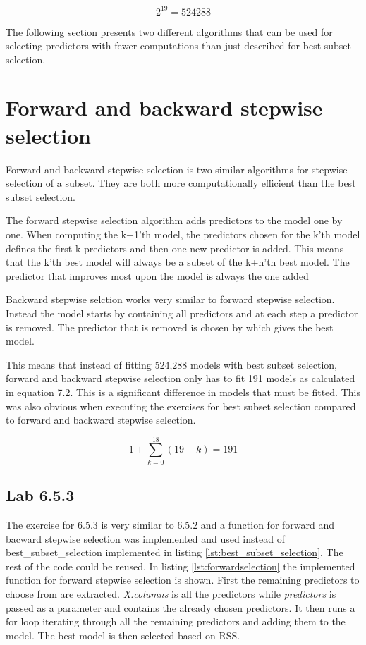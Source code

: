 \begin{equation}
2^{19} = 524288
\end{equation}

The following section presents two different algorithms that can be used for selecting predictors with fewer computations than just described for best subset selection.

\section{Forward and backward stepwise selection}
Forward and backward stepwise selection is two similar algorithms for stepwise selection of a subset. They are both more computationally efficient than the best subset selection.

The forward stepwise selection algorithm adds predictors to the model one by one. When computing the k+1'th model, the predictors chosen for the k'th model defines the first k predictors and then one new predictor is added. This means that the k'th best model will always be a subset of the k+n'th best model. The predictor that improves most upon the model is always the one added

Backward stepwise selction works very similar to forward stepwise selection. Instead the model starts by containing all predictors and at each step a predictor is removed. The predictor that is removed is chosen by which gives the best model.

This means that instead of fitting 524,288 models with best subset selection, forward and backward stepwise selection only has to fit 191 models as calculated in equation 7.2. This is a significant difference in models that must be fitted.  This was also obvious when executing the exercises for best subset selection compared to forward and backward stepwise selection.

\begin{equation}
1+ \sum_{k=0}^{18}(19-k) = 191
\end{equation}

\subsection{Lab 6.5.3}
The exercise for 6.5.3 is very similar to 6.5.2 and a function for forward and bacward stepwise selection was implemented and used instead of best\_subset\_selection implemented in listing \ref{lst:best_subset_selection}. The rest of the code could be reused. In listing \ref{lst:forwardselection} the implemented function for forward stepwise selection is shown. First the remaining predictors to choose from are extracted. \emph{X.columns} is all the predictors while \emph{predictors} is passed as a parameter and contains the already chosen predictors. It then runs a for loop iterating through all the remaining predictors and adding them to the model. The best model is then selected based on RSS.


